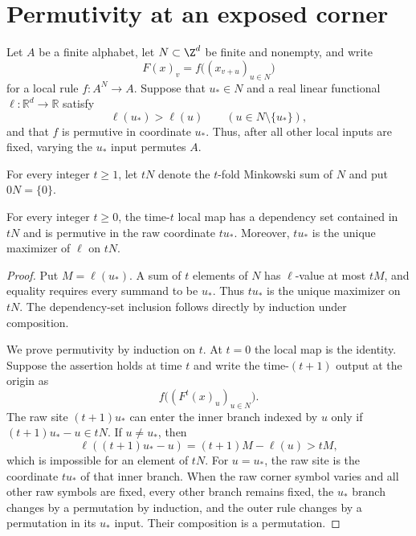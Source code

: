 \section{Permutivity at an exposed corner}
\label{sec:corner}

Let $A$ be a finite alphabet, let $N\subset\Z^d$ be finite and nonempty, and
write
\begin{equation}\label{eq:local-rule}
  F(x)_v=f\bigl((x_{v+u})_{u\in N}\bigr)
\end{equation}
for a local rule $f\colon A^N\to A$.  Suppose that $u_*\in N$ and a real
linear functional $\ell\colon\mathbb R^d\to\mathbb R$ satisfy
\begin{equation}\label{eq:exposed}
  \ell(u_*)>\ell(u)\qquad(u\in N\setminus\{u_*\}),
\end{equation}
and that $f$ is permutive in coordinate $u_*$.  Thus, after all other local
inputs are fixed, varying the $u_*$ input permutes $A$.

For every integer $t\geq1$, let $tN$ denote the $t$-fold Minkowski sum of $N$ and put
$0N=\{0\}$.

\begin{lemma}\label{lem:corner-iterate}
For every integer $t\geq0$, the time-$t$ local map has a dependency set contained in
$tN$ and is permutive in the raw coordinate $tu_*$.  Moreover, $tu_*$ is
the unique maximizer of $\ell$ on $tN$.
\end{lemma}

\begin{proof}
Put $M=\ell(u_*)$.  A sum of $t$ elements of $N$ has $\ell$-value at most
$tM$, and equality requires every summand to be $u_*$.  Thus $tu_*$ is the
unique maximizer on $tN$.  The dependency-set inclusion follows directly by
induction under composition.

We prove permutivity by induction on $t$.  At $t=0$ the local map is the
identity.  Suppose the assertion holds at time $t$ and write the
time-$(t+1)$ output at the origin as
\[
  f\bigl((F^t(x)_u)_{u\in N}\bigr).
\]
The raw site $(t+1)u_*$ can enter the inner branch indexed by $u$ only if
$(t+1)u_*-u\in tN$.  If $u\neq u_*$, then
\[
   \ell((t+1)u_*-u)=(t+1)M-\ell(u)>tM,
\]
which is impossible for an element of $tN$.  For $u=u_*$, the raw site is
the coordinate $tu_*$ of that inner branch.  When the raw corner symbol
varies and all other raw symbols are fixed, every other branch remains
fixed, the $u_*$ branch changes by a permutation by induction, and the outer
rule changes by a permutation in its $u_*$ input.  Their composition is a
permutation.
\end{proof}

